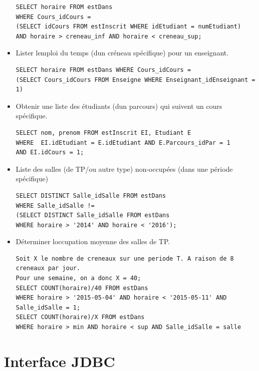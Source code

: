 \documentclass{article}
\begin{document}
\begin{itemize}
\begin{verbatim}
SELECT horaire FROM estDans 
WHERE Cours_idCours = 
(SELECT idCours FROM estInscrit WHERE idEtudiant = numEtudiant) 
AND horaire > creneau_inf AND horaire < creneau_sup;

\end{verbatim}
\item Lister l\textquotesingle emploi du temps (d\textquotesingle un cr\'eneau sp\'ecifique) pour un enseignant.\\
\begin{verbatim}
SELECT horaire FROM estDans WHERE Cours_idCours = 
(SELECT Cours_idCours FROM Enseigne WHERE Enseignant_idEnseignant = 1)

\end{verbatim}
\item Obtenir une liste des \'etudiants (d\textquotesingle un parcours) qui suivent un cours sp\'ecifique.\\
\begin{verbatim}
SELECT nom, prenom FROM estInscrit EI, Etudiant E 
WHERE  EI.idEtudiant = E.idEtudiant AND E.Parcours_idPar = 1
AND EI.idCours = 1;

\end{verbatim}
\item Liste des salles (de TP/ou autre type) non-occup\'ees (dans une p\'eriode sp\'ecifique)\\
\begin{verbatim}
SELECT DISTINCT Salle_idSalle FROM estDans 
WHERE Salle_idSalle != 
(SELECT DISTINCT Salle_idSalle FROM estDans 
WHERE horaire > '2014' AND horaire < '2016');

\end{verbatim}
\item D\'eterminer l\textquotesingle occupation moyenne des salles de TP.\\
\begin{verbatim}
Soit X le nombre de creneaux sur une periode T. A raison de 8 creneaux par jour. 
Pour une semaine, on a donc X = 40;
SELECT COUNT(horaire)/40 FROM estDans 
WHERE horaire > '2015-05-04' AND horaire < '2015-05-11' AND Salle_idSalle = 1;
SELECT COUNT(horaire)/X FROM estDans 
WHERE horaire > min AND horaire < sup AND Salle_idSalle = salle

\end{verbatim}
\end{itemize}
\section{Interface JDBC}
\end{document}
